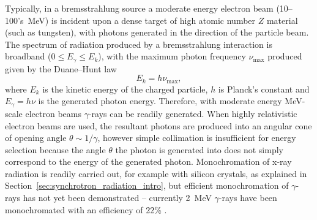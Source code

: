 \documentclass[../main.tex]{subfiles}
\begin{document}
Typically, in a bremsstrahlung source a moderate energy electron beam (10--100's~\si{\mega\electronvolt}) is incident upon a dense target of high atomic number $Z$ material (such as tungsten), with photons generated in the direction of the particle beam. The spectrum of radiation produced by a bremsstrahlung interaction is broadband ($0 \leq E_{\gamma} \leq E_{k}$), with the maximum photon frequency $\nu_{\mathrm{max}}$ produced given by the Duane--Hunt law \cite{duane1915proceedings}
\begin{equation}
E_{k}=h\nu_{\mathrm{max}},
\label{eq:duane_hunt_intro}
\end{equation}
where $E_{k}$ is the kinetic energy of the charged particle, $h$ is Planck's constant and $E_{\gamma}=h\nu$ is the generated photon energy. Therefore, with moderate energy \si{\mega\electronvolt}-scale electron beams $\gamma$-rays can be readily generated. When highly relativistic electron beams are used, the resultant photons are produced into an angular cone of opening angle $\theta\sim 1/\gamma$, however simple collimation is insufficient for energy selection because the angle $\theta$ the photon is generated into does not simply correspond to the energy of the generated photon. Monochromation of x-ray radiation is readily carried out, for example with silicon crystals, as explained in Section~\ref{sec:synchrotron_radiation_intro}, but efficient monochromation of $\gamma$-rays has not yet been demonstrated -- currently 2~\si{\mega\electronvolt} $\gamma$-rays have been monochromated with an efficiency of 22\% \cite{jentschel2012gamma}. 
\end{document}
